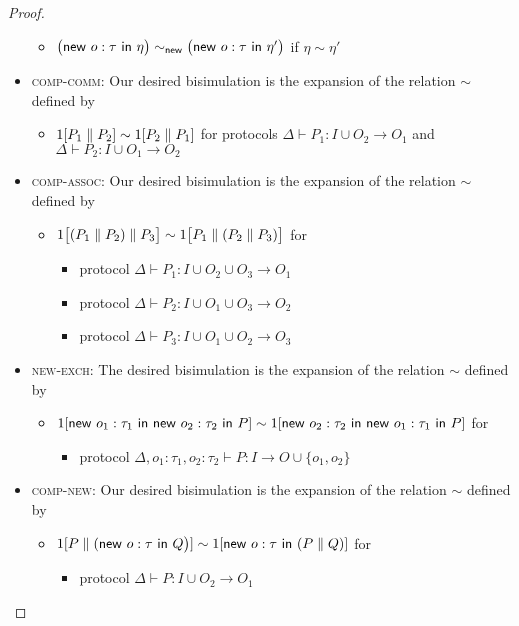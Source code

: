 \begin{proof}
\begin{itemize}
\begin{itemize}
\item $\big(\mathsf{new} \ o : \tau \ \mathsf{in} \ \eta\big) \sim_{\mathsf{new}} \big(\mathsf{new} \ o : \tau \ \mathsf{in} \ \eta'\big)$ if $\eta \sim \eta'$
\end{itemize}
\item \textsc{comp-comm}: Our desired bisimulation is the expansion of the relation $\sim$ defined by
\begin{itemize}
\item $1[P_1 \; \| \; P_2] \sim 1[P_2 \; \| \; P_1]$ for protocols $\Delta \vdash P_1 : I \cup O_2 \to O_1$ and $\Delta \vdash P_2 : I \cup O_1 \to O_2$
\end{itemize}
\item \textsc{comp-assoc}: Our desired bisimulation is the expansion of the relation $\sim$ defined by
\begin{itemize}
\item $1\big[(P_1 \; \| \; P_2) \; \| \; P_3\big] \sim 1\big[P_1 \; \| \; (P_2 \; \| \; P_3)\big]$ for
\begin{itemize}
\item protocol $\Delta \vdash P_1 : I \cup O_2 \cup O_3 \to O_1$
\item protocol $\Delta \vdash P_2 : I \cup O_1 \cup O_3 \to O_2$
\item protocol $\Delta \vdash P_3 : I \cup O_1 \cup O_2 \to O_3$
\end{itemize}
\end{itemize}
\item \textsc{new-exch}: The desired bisimulation is the expansion of the relation $\sim$ defined by
\begin{itemize}
\item $1[\mathsf{new} \ o_1 : \tau_1 \ \mathsf{in} \ \mathsf{new} \ o_2 : \tau_2 \ \mathsf{in} \ P] \sim 1[\mathsf{new} \ o_2 : \tau_2 \ \mathsf{in} \ \mathsf{new} \ o_1 : \tau_1 \ \mathsf{in} \ P]$ for
\begin{itemize}
\item protocol $\Delta, o_1 : \tau_1, o_2 : \tau_2 \vdash P : I \to O \cup \{o_1,o_2\}$
\end{itemize}
\end{itemize}
\item \textsc{comp-new}: Our desired bisimulation is the expansion of the relation $\sim$ defined by
\begin{itemize}
\item $1[P \; \| \; (\mathsf{new} \ o : \tau \ \mathsf{in} \ Q\big)] \sim 1[\mathsf{new} \ o : \tau \ \mathsf{in} \ (P \; \| \; Q)]$ for
\begin{itemize}
\item protocol $\Delta \vdash P : I \cup O_2 \to O_1$

\end{itemize}
\end{itemize}
\end{itemize}
\end{proof}
